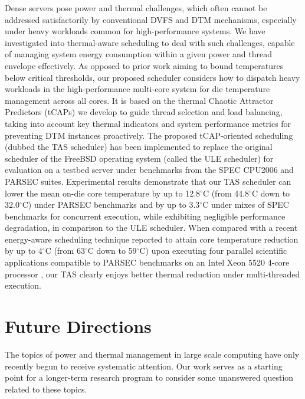 Dense servers pose power and thermal challenges, which often cannot be
addressed satisfactorily by conventional DVFS and DTM mechanisms,
especially under heavy workloads common for high-performance systems.
We have investigated into thermal-aware scheduling to deal with such
challenges, capable of managing system energy consumption within a given
power and thread envelope effectively.  As opposed to prior work aiming
to bound temperatures below critical thresholds, our proposed scheduler
considers how to dispatch heavy workloads in the high-performance
multi-core system for die temperature management across all cores.  It
is based on the thermal Chaotic Attractor Predictors (tCAPs) we develop
to guide thread selection and load balancing, taking into account key
thermal indicators and system performance metrics for preventing DTM
instances proactively.  The proposed tCAP-oriented scheduling (dubbed
the TAS scheduler) has been implemented to replace the original
scheduler of the FreeBSD operating system (called the ULE scheduler) for
evaluation on a testbed server under benchmarks from the SPEC CPU2006
and PARSEC suites.  Experimental results demonstrate that our TAS
scheduler can lower the mean on-die core temperature by up to
12.8$^{\circ}$C (from 44.8$^\circ$C down to 32.0$^\circ$C) under PARSEC
benchmarks and by up to 3.3$^{\circ}$C under mixes of SPEC benchmarks
for concurrent execution, while exhibiting negligible performance
degradation, in comparison to the ULE scheduler.  When compared with a
recent energy-aware scheduling technique reported to attain core
temperature reduction by up to 4$^\circ$C (from 63$^\circ$C down to
59$^\circ$C) upon executing four parallel scientific applications
compatible to PARSEC benchmarks on an Intel Xeon 5520 4-core processor
\cite{Sarood2011}, our TAS clearly enjoys better thermal reduction under
multi-threaded execution.

\section{Future Directions}
\label{sec:future-directions}
The topics of power and thermal management in large scale computing have
only recently begun to receive systematic attention.  Our work serves as
a starting point for a longer-term research program to consider some
unanswered question related to these topics.

